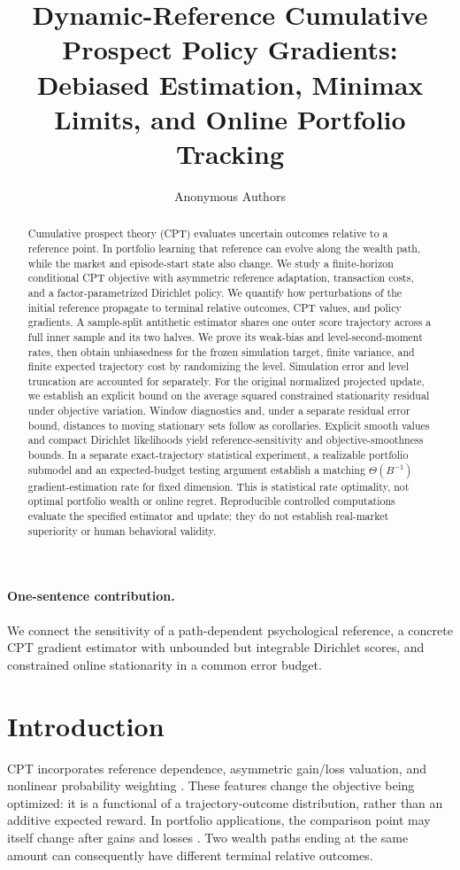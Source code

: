 \documentclass[11pt]{article}
\title{Dynamic-Reference Cumulative Prospect Policy Gradients:\\Debiased Estimation, Minimax Limits, and Online Portfolio Tracking}
\author{Anonymous Authors}
\date{}
\newcommand{\1}{\mathbf 1}
\theoremstyle{definition}
\begin{document}
\maketitle
\begin{abstract}
Cumulative prospect theory (CPT) evaluates uncertain outcomes relative to a reference point. In portfolio learning that reference can evolve along the wealth path, while the market and episode-start state also change. We study a finite-horizon conditional CPT objective with asymmetric reference adaptation, transaction costs, and a factor-parametrized Dirichlet policy. We quantify how perturbations of the initial reference propagate to terminal relative outcomes, CPT values, and policy gradients. A sample-split antithetic estimator shares one outer score trajectory across a full inner sample and its two halves. We prove its weak-bias and level-second-moment rates, then obtain unbiasedness for the frozen simulation target, finite variance, and finite expected trajectory cost by randomizing the level. Simulation error and level truncation are accounted for separately. For the original normalized projected update, we establish an explicit bound on the average squared constrained stationarity residual under objective variation. Window diagnostics and, under a separate residual error bound, distances to moving stationary sets follow as corollaries. Explicit smooth values and compact Dirichlet likelihoods yield reference-sensitivity and objective-smoothness bounds. In a separate exact-trajectory statistical experiment, a realizable portfolio submodel and an expected-budget testing argument establish a matching $\Theta(B^{-1})$ gradient-estimation rate for fixed dimension. This is statistical rate optimality, not optimal portfolio wealth or online regret. Reproducible controlled computations evaluate the specified estimator and update; they do not establish real-market superiority or human behavioral validity.
\end{abstract}

\paragraph{One-sentence contribution.}
We connect the sensitivity of a path-dependent psychological reference, a concrete CPT gradient estimator with unbounded but integrable Dirichlet scores, and constrained online stationarity in a common error budget.

\section{Introduction}\label{sec:introduction}
CPT incorporates reference dependence, asymmetric gain/loss valuation, and nonlinear probability weighting \citep{kahneman1979prospect,tversky1992advances}. These features change the objective being optimized: it is a functional of a trajectory-outcome distribution, rather than an additive expected reward. In portfolio applications, the comparison point may itself change after gains and losses \citep{arkes2008reference,arkes2010cross}. Two wealth paths ending at the same amount can consequently have different terminal relative outcomes.
\end{document}
